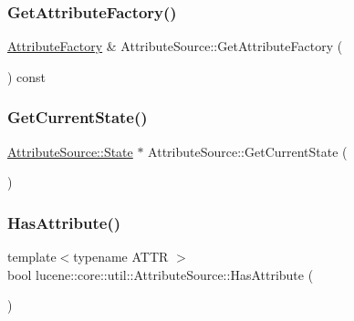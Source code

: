 \subsubsection{\texorpdfstring{Get\+Attribute\+Factory()}{GetAttributeFactory()}}
{\footnotesize\ttfamily \mbox{\hyperlink{classlucene_1_1core_1_1util_1_1AttributeFactory}{Attribute\+Factory}} \& Attribute\+Source\+::\+Get\+Attribute\+Factory (\begin{DoxyParamCaption}{ }\end{DoxyParamCaption}) const}

\mbox{\label{classlucene_1_1core_1_1util_1_1AttributeSource_a7a8f566041a7140d8ff8d6bea8e45b0f}} 
\subsubsection{\texorpdfstring{Get\+Current\+State()}{GetCurrentState()}}
{\footnotesize\ttfamily \mbox{\hyperlink{classlucene_1_1core_1_1util_1_1AttributeSource_1_1State}{Attribute\+Source\+::\+State}} $\ast$ Attribute\+Source\+::\+Get\+Current\+State (\begin{DoxyParamCaption}{ }\end{DoxyParamCaption})\hspace{0.3cm}{\ttfamily [private]}}

\mbox{\label{classlucene_1_1core_1_1util_1_1AttributeSource_a214d5ca7edcf7bed74db8d73c73f9802}} 
\subsubsection{\texorpdfstring{Has\+Attribute()}{HasAttribute()}}
{\footnotesize\ttfamily template$<$typename A\+T\+TR $>$ \\
bool lucene\+::core\+::util\+::\+Attribute\+Source\+::\+Has\+Attribute (\begin{DoxyParamCaption}{ }\end{DoxyParamCaption})\hspace{0.3cm}{\ttfamily [inline]}}

